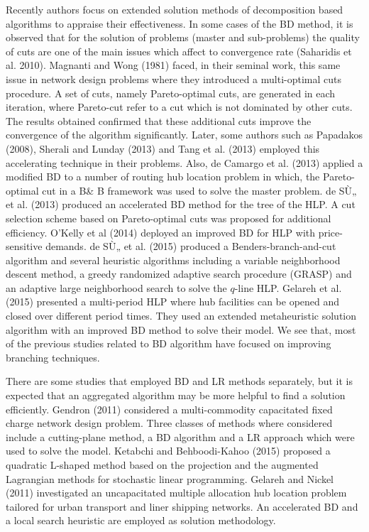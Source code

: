 \documentclass[review]{elsarticle}
\begin{document}
Recently authors focus on extended solution methods of decomposition based algorithms to appraise their effectiveness. In some cases of the BD method, it is observed that for the solution of problems (master and sub-problems) the quality of cuts are one of the main issues which affect to convergence rate (Saharidis et al. 2010). Magnanti and Wong (1981) faced, in their seminal work, this same issue in network design problems where they introduced a multi-optimal cuts procedure. A set of cuts, namely Pareto-optimal cuts, are generated in each iteration, where Pareto-cut refer to a cut which is not dominated by other cuts. The results obtained confirmed that these additional cuts improve the convergence of the algorithm significantly. Later, some authors such as Papadakos (2008), Sherali and Lunday (2013) and Tang et al. (2013) employed this accelerating technique in their problems. Also, de Camargo et al. (2013) applied a modified BD to a number of routing hub location problem in which, the Pareto-optimal cut in a B\& B framework was used to solve the master problem. de SÙ„ et al. (2013) produced an accelerated BD method for the tree of the HLP. A cut selection scheme based on Pareto-optimal cuts was proposed for additional efficiency. O'Kelly et al (2014) deployed an improved BD for HLP with price-sensitive demands. de SÙ„ et al. (2015) produced a Benders-branch-and-cut algorithm and several heuristic algorithms including a variable neighborhood descent method, a greedy randomized adaptive search procedure (GRASP) and an adaptive large neighborhood search to solve the $q$-line HLP. Gelareh et al. (2015) presented a multi-period HLP where hub facilities can be opened and closed over different period times. They used an extended metaheuristic solution algorithm with an improved BD method to solve their model. We see that, most of the previous studies related to BD algorithm have focused on improving branching techniques. 

There are some studies that employed BD and LR methods separately, but it is expected that an aggregated algorithm may be more helpful to find a solution efficiently. Gendron (2011) considered a multi-commodity capacitated fixed charge network design problem. Three classes of methods where considered include a cutting-plane method, a BD algorithm and a LR approach which were used to solve the model. Ketabchi and Behboodi-Kahoo (2015) proposed a quadratic L-shaped method based on the projection and the augmented Lagrangian methods for stochastic linear programming. Gelareh and Nickel (2011) investigated an uncapacitated multiple allocation hub location problem tailored for urban transport and liner shipping networks. An accelerated BD and a local search heuristic are employed as solution methodology.
\end{document}
